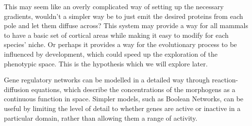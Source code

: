 \documentclass[a4paper,11pt]{article}
\begin{document}

This may seem like an overly complicated way of setting up the necessary gradients, wouldn't a simpler way be to just emit the desired proteins from each pole and let them diffuse across? This system may provide a way for all mammals to have a basic set of cortical areas while making it easy to modify for each species' niche. Or perhaps it provides a way for the evolutionary process to be influenced by development, which could speed up the exploration of the phenotypic space. This is the hypothesis which we will explore later.\par

Gene regulatory networks can be modelled in a detailed way through reaction-diffusion equations, which describe the concentrations of the morphogens as a continuous function in space. Simpler models, such as Boolean Networks, can be useful by limiting the level of detail to whether genes are active or inactive in a particular domain, rather than allowing them a range of activity.\par
\end{document}
